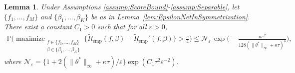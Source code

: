 \documentclass[twoside, onecolumn]{article}
\def\varep{\varepsilon}
\DeclareMathOperator*{\maximize}{maximize}
\newtheorem{lemma}{Lemma}
\begin{document}
\begin{lemma}\label{lem:MaxBound}
Under Assumptions \ref{assump:ScoreBound}-\ref{assump:Separable}, let $\{f_1, \dots, f_M\}$ and $\{\beta_1, \dots, \beta_K\}$ be as in Lemma~\ref{lem:EpsilonNetInSymmetrization}. %
There exist a constant $C_1>0$ such that for all $\varep>0$,
\begin{align*}
\mathbb{P}\bigg( 
\maximize_{\substack{f\in \{f_1, \dots, f_M\}\\ \beta\in \{\beta_1, \dots, \beta_K\}}}
\{\widetilde{R}_{\text{emp}}(f,\beta)-\widetilde{R}_{\text{emp}}'(f,\beta)\}>\frac{\varepsilon}{4}
\bigg)\leq 
\mathcal{N}_{\varep} \,\exp\Big(-  \frac{n\varepsilon^2}{128(\|\theta^*\|_\infty+\kappa \tau)^{4}}\Big),
\end{align*}
where $\mathcal{N}_{\varep}=\{1+2(\|\theta^*\|_\infty+\kappa\tau)/\varep\} 
\exp( C_1\tau^2 \varepsilon^{-2})$.
\end{lemma}
\end{document}
